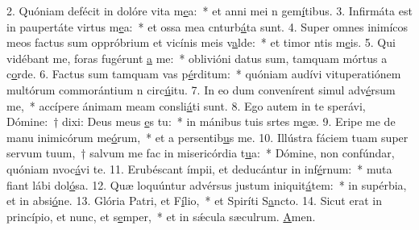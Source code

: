 2. Quóniam defécit in dolóre vita m\uline{e}a:~* et anni mei n gem\uline{í}tibus.
3. Infirmáta est in paupertáte virtus m\uline{e}a:~* et ossa mea cnturb\uline{á}ta sunt.
4. Super omnes inimícos meos factus sum oppróbrium et vicínis meis v\uline{a}lde:~* et timor ntis m\uline{e}is.
5. Qui vidébant me, foras fugérunt \uline{a} me:~* oblivióni datus sum, tamquam mórtus a c\uline{o}rde.
6. Factus sum tamquam vas p\uline{é}rditum:~* quóniam audívi vituperatiónem multórum commorántium n circ\uline{ú}itu.
7. In eo dum convenírent simul adv\uline{é}rsum me,~* accípere ánimam meam consli\uline{á}ti sunt.
8. Ego autem in te sperávi, Dómine:~† dixi: Deus meus \uline{e}s tu:~* in mánibus tuis srtes m\uline{e}æ.
9. Eripe me de manu inimicórum me\uline{ó}rum,~* et a persentib\uline{u}s me.
10. Illústra fáciem tuam super servum tuum,~† salvum me fac in misericórdia t\uline{u}a:~* Dómine, non confúndar, quóniam nvoc\uline{á}vi te.
11. Erubéscant ímpii, et deducántur in inf\uline{é}rnum:~* muta fiant lábi dol\uline{ó}sa.
12. Quæ loquúntur advérsus justum iniquit\uline{á}tem:~* in supérbia, et in absi\uline{ó}ne.
13. Glória Patri, et F\uline{í}lio,~* et Spiríti S\uline{a}ncto.
14. Sicut erat in princípio, et nunc, et s\uline{e}mper,~* et in sǽcula sæculrum. \uline{A}men.
